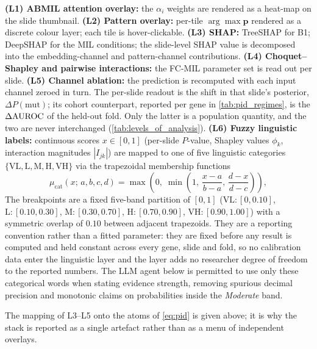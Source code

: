 \textbf{(L1) ABMIL attention overlay:} the $\alpha_i$ weights are
rendered as a heat-map on the slide thumbnail.
\textbf{(L2) Pattern overlay:} per-tile $\arg\max\mathbf{p}$
rendered as a discrete colour layer; each tile is hover-clickable.
\textbf{(L3) SHAP:}
TreeSHAP\cite{lundberg2017shap,lundberg2020treeshap} for B1;
DeepSHAP for the MIL conditions; the slide-level SHAP value is
decomposed into the embedding-channel and pattern-channel
contributions.
\textbf{(L4) Choquet--Shapley and pairwise
interactions:}\cite{shapley1953value,grabisch1996application}
the FC-MIL parameter set is read out per slide.
\textbf{(L5) Channel ablation:} the prediction is recomputed with
each input channel zeroed in turn.
The per-slide readout is the shift in that slide's posterior,
$\Delta P(\mathrm{mut})$; its cohort counterpart, reported per gene
in \cref{tab:pid_regimes}, is the $\Delta\text{AUROC}$ of the held-out
fold. Only the latter is a population quantity, and the two are
never interchanged (\cref{tab:levels_of_analysis}).
\textbf{(L6) Fuzzy linguistic labels:} continuous scores
$x\!\in\![0,1]$ (per-slide $P$-value, Shapley values
$\phi_k$, interaction magnitudes $|I_{jk}|$) are mapped to one of
five linguistic categories
$\{\mathrm{VL},\mathrm{L},\mathrm{M},\mathrm{H},\mathrm{VH}\}$ via
the trapezoidal membership functions
\begin{equation}
\mu_{\mathrm{cat}}(x;\,a,b,c,d) =
\max\!\left(0,\;
\min\!\left(1,\,\frac{x-a}{b-a},\,\frac{d-x}{d-c}\right)\right),
\label{eq:trap_mf}
\end{equation}
The breakpoints are a fixed five-band partition of $[0,1]$
($\mathrm{VL}\!:\![0,0.10]$, $\mathrm{L}\!:\![0.10,0.30]$,
$\mathrm{M}\!:\![0.30,0.70]$, $\mathrm{H}\!:\![0.70,0.90]$,
$\mathrm{VH}\!:\![0.90,1.00]$) with a symmetric overlap of $0.10$
between adjacent trapezoids.
They are a reporting convention rather than a fitted parameter:
they are fixed before any result is computed and held constant
across every gene, slide and fold, so no calibration data enter the
linguistic layer and the layer adds no researcher degree of freedom
to the reported numbers.
The LLM agent below is permitted to use only these categorical
words when stating evidence strength, removing spurious decimal
precision and monotonic claims on probabilities inside the
\emph{Moderate} band.

The mapping of L3--L5 onto the atoms of \cref{eq:pid} is given
above; it is why the stack is reported as a single artefact rather
than as a menu of independent overlays.

